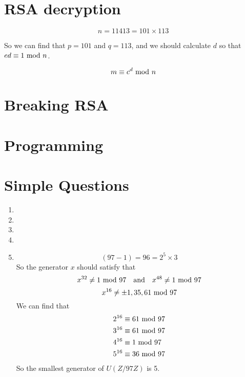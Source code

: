 \documentclass{article}
\renewcommand{\mod}{{\rm\ mod\ }}
\begin{document}
\section{RSA decryption}
$$n=11413=101\times113$$

So we can find that $p=101$ and $q=113$, and we should calculate $d$ so that $ed\equiv1\mod n$.

$$m\equiv c^d\mod n$$

\section{Breaking RSA}

\section{Programming}

\section{Simple Questions}
\begin{enumerate}
\item
\item
\item
\item
\item
$$(97-1)=96=2^5\times3$$
So the generator $x$ should satisfy that 
$$x^{32}\neq 1\mod 97\quad{\rm and}\quad x^{48}\neq 1\mod 97$$
$$x^{16}\neq \pm 1,35,61\mod 97$$
We can find that
\begin{align*}
2^{16}&\equiv61\mod97\\
3^{16}&\equiv61\mod97\\
4^{16}&\equiv1\mod97\\
5^{16}&\equiv36\mod97
\end{align*}
So the smallest generator of $U(Z/97Z)$ is 5.
\end{enumerate}
\end{document}
